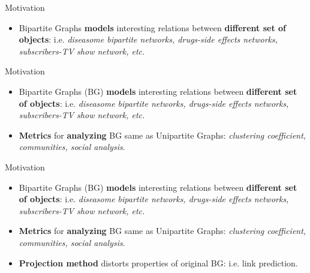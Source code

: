 
\begin{frame}[fragile]{Motivation}
  \begin{itemize}
    \item Bipartite Graphs \textbf{models} interesting relations between \textbf{different set of objects}: i.e. \emph{diseasome bipartite networks, drugs-side effects networks, subscribers-TV show network, etc.}
  \end{itemize}
\end{frame}

\begin{frame}[fragile]{Motivation}
    \begin{itemize}
      \setlength\itemsep{2em}
      \item {\color{light}Bipartite Graphs (BG) \textbf{models} interesting relations between \textbf{different set of objects}: i.e. \emph{diseasome bipartite networks, drugs-side effects networks, subscribers-TV show network, etc.}}
      \item \textbf{Metrics} for \textbf{analyzing} BG same as Unipartite Graphs: \emph{clustering coefficient, communities, social analysis}.
    \end{itemize}
\end{frame}

\begin{frame}[fragile]{Motivation}
    \begin{itemize}
      \setlength\itemsep{2em}
      \item {\color{light}Bipartite Graphs (BG) \textbf{models} interesting relations between \textbf{different set of objects}: i.e. \emph{diseasome bipartite networks, drugs-side effects networks, subscribers-TV show network, etc.}}
      \item {\color{light}\textbf{Metrics} for \textbf{analyzing} BG same as Unipartite Graphs: \emph{clustering coefficient, communities, social analysis}.}
      \item \textbf{Projection method} distorts properties of original BG: i.e. link prediction.
    \end{itemize}
\end{frame}

